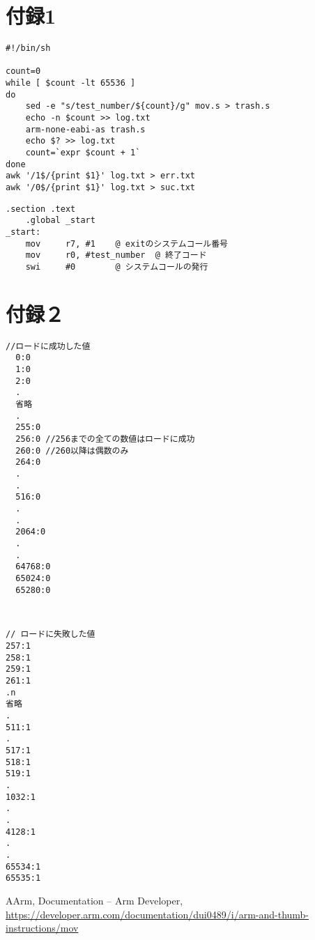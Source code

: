 \documentclass[a4j]{jarticle}
\renewcommand{\lstlistingname}{実行例}
\begin{document}
\newpage
\appendix
\renewcommand{\lstlistingname}{ソースコード}
\setcounter{lstlisting}{0}
\section{付録1}
\begin{lstlisting}[caption=test.sh]
  #!/bin/sh

count=0
while [ $count -lt 65536 ]
do
    sed -e "s/test_number/${count}/g" mov.s > trash.s
    echo -n $count >> log.txt
    arm-none-eabi-as trash.s
    echo $? >> log.txt
    count=`expr $count + 1`
done
awk '/1$/{print $1}' log.txt > err.txt
awk '/0$/{print $1}' log.txt > suc.txt
\end{lstlisting}

\begin{lstlisting}[caption=mov.s, label=mov]
    .section .text
    .global _start
_start:
    mov     r7, #1    @ exitのシステムコール番号
    mov     r0, #test_number  @ 終了コード
    swi     #0        @ システムコールの発行
\end{lstlisting}
\section{付録２}
\setcounter{lstlisting}{0}
\renewcommand{\lstlistingname}{結果}
\begin{lstlisting}[caption=suc.txt]
  //ロードに成功した値
  0:0
  1:0
  2:0
  .
  省略
  .
  255:0
  256:0 //256までの全ての数値はロードに成功
  260:0 //260以降は偶数のみ
  264:0
  .
  .
  516:0
  .
  .
  2064:0
  .
  .
  64768:0
  65024:0
  65280:0
  
  
\end{lstlisting}
\begin{lstlisting}[caption=err.txt]
// ロードに失敗した値
257:1
258:1
259:1
261:1
.n
省略
.
511:1
.
517:1
518:1
519:1
.
1032:1
.
.
4128:1
.
.
65534:1
65535:1
\end{lstlisting}
\begin{thebibliography}{9}
  \bibitem AArm, Documentation – Arm Developer, \url{https://developer.arm.com/documentation/dui0489/i/arm-and-thumb-instructions/mov}
\end{thebibliography}
\end{document}
